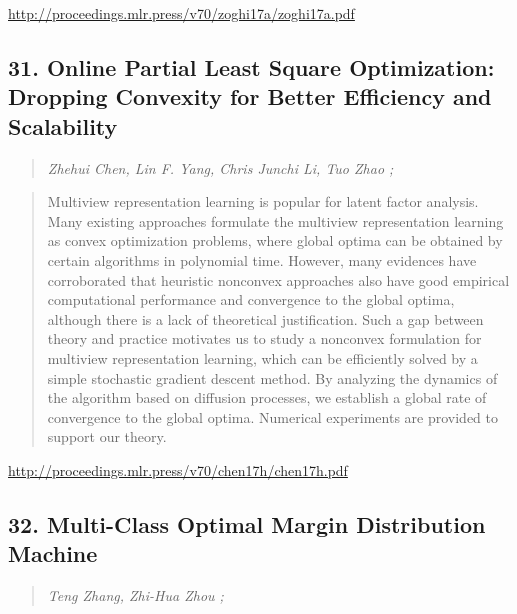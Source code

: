 \documentclass{article}
\begin{document}
\href{http://proceedings.mlr.press/v70/zoghi17a/zoghi17a.pdf}{http://proceedings.mlr.press/v70/zoghi17a/zoghi17a.pdf}

\subsection{31. Online Partial Least Square Optimization: Dropping Convexity for Better Efficiency and Scalability}

\begin{quote}
\footnotesize{\textit{Zhehui Chen, Lin F. Yang, Chris Junchi Li, Tuo Zhao ;}}
\end{quote}

\begin{quote}
    Multiview representation learning is popular for latent factor analysis. Many existing approaches formulate the multiview representation learning as convex optimization problems, where global optima can be obtained by certain algorithms in polynomial time. However, many evidences have corroborated that heuristic nonconvex approaches also have good empirical computational performance and convergence to the global optima, although there is a lack of theoretical justification. Such a gap between theory and practice motivates us to study a nonconvex formulation for multiview representation learning, which can be efficiently solved by a simple stochastic gradient descent method. By analyzing the dynamics of the algorithm based on diffusion processes, we establish a global rate of convergence to the global optima. Numerical experiments are provided to support our theory.  \end{quote}

\href{http://proceedings.mlr.press/v70/chen17h/chen17h.pdf}{http://proceedings.mlr.press/v70/chen17h/chen17h.pdf}

\subsection{32. Multi-Class Optimal Margin Distribution Machine}

\begin{quote}
\footnotesize{\textit{Teng Zhang, Zhi-Hua Zhou ;}}
\end{quote}
\end{document}
